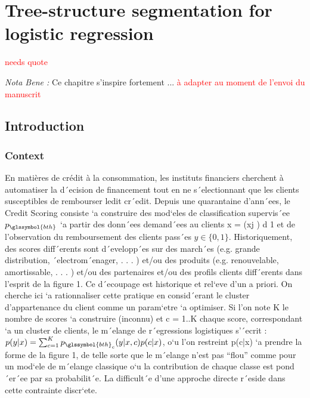 \chapter{Tree-structure segmentation for logistic regression} \label{chap6}

\minitoc

\textcolor{red}{needs quote}

\textit{Nota Bene :} Ce chapitre s'inspire fortement ... \textcolor{red}{à adapter au moment de l'envoi du manuscrit}





\section{Introduction}

\subsection{Context}

En matières de crédit à la consommation, les instituts financiers cherchent à automatiser la d´ecision de financement tout en ne s´electionnant que les clients susceptibles
de rembourser ledit cr´edit. Depuis une quarantaine d’ann´ees, le Credit Scoring consiste `a construire des mod`eles
de classification supervis´ee $p_{\glssymbol{bth}}$ `a partir des donn´ees demand´ees au clients x = (xj )
d
1
et de l’observation du
remboursement des clients pass´es $y \in \{0, 1\}$. Historiquement, des scores diff´erents sont d´evelopp´es sur des
march´es (e.g. grande distribution, ´electrom´enager, . . . ) et/ou des produits (e.g. renouvelable, amortissable, . . . )
et/ou des partenaires et/ou des profils clients diff´erents dans l’esprit de la figure 1. Ce d´ecoupage est historique
et rel`eve d’un a priori. On cherche ici `a rationnaliser cette pratique en consid´erant le cluster d’appartenance du
client comme un param`etre `a optimiser. Si l’on note K le nombre de scores `a construire (inconnu) et c = 1..K
chaque score, correspondant `a un cluster de clients, le m´elange de r´egressions logistiques s’´ecrit :
$p(y|x) = \sum_{c=1}^K p_{\glssymbol{bth}_c}(y|x, c)p(c|x)$,
o`u l’on restreint p(c|x) `a prendre la forme de la figure 1, de telle sorte que le m´elange n’est pas “flou” comme
pour un mod`ele de m´elange classique o`u la contribution de chaque classe est pond´er´ee par sa probabilit´e. La
difficult´e d’une approche directe r´eside dans cette contrainte discr`ete.



